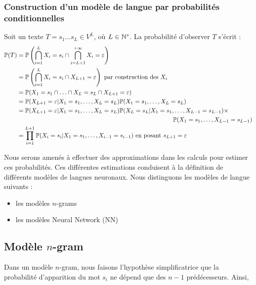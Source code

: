\subsubsection{Construction d'un modèle de langue par probabilités conditionnelles}
Soit un texte $T=s_1\ldots s_L \in V^L$, où $L \in\mathbb{N}^*$. La probabilité d'observer $T$ s'écrit :
\begin{align*}
  \P(T) &= \P\left(\bigcap_{i=1}^L X_i=s_i \cap \bigcap_{i=L+1}^{+\infty} X_i = \varepsilon\right) \\
  &= \P\left(\bigcap_{i=1}^L X_i=s_i \cap X_{L+1} = \varepsilon  \right) \text{ par construction des } X_i\\
  &= \P(X_1 = s_1 \cap \ldots \cap X_L = s_L \cap X_{L+1} = \varepsilon) \\
  &= \P(X_{L+1}=\varepsilon \vert X_1=s_1,\ldots, X_L=s_L)\P(X_1=s_1,\ldots, X_L=s_L) \\
  &= \P(X_{L+1}=\varepsilon \vert X_1=s_1,\ldots, X_L=s_L)\P(X_L=s_L\vert X_1=s_1,\ldots, X_{L-1}=s_{L-1}) \times \\
  & \hspace{9cm}\P(X_1=s_1 ,\ldots, X_{L-1}=s_{L-1}) \\
  &=\prod_{i=1}^{L+1} \P(X_i=s_i \vert X_1=s_1,\ldots, X_{i-1}=s_{i-1}) \text{ en posant } s_{L+1} = \varepsilon
\end{align*}


Nous serons amenés à effectuer des approximations dans les calculs pour estimer ces probabilités.
Ces différentes estimations conduisent à la définition de différents modèles de langues neuronaux.
Nous distinguons les modèles de langue suivants :

\begin{itemize}
  \item les modèles $n$-grams
  \item les modèles Neural Network (NN)
\end{itemize}

\subsection{Modèle $n$-gram}
Dans un modèle $n$-gram, nous faisons l'hypothèse simplificatrice que la probabilité d'apparition du mot $s_i$ ne dépend que des $n-1$ prédécesseurs. Ainsi,


